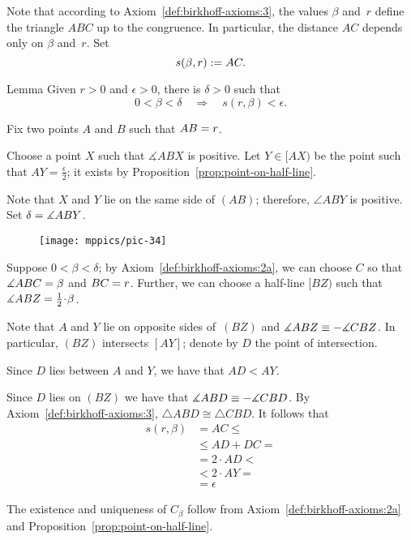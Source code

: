 Note that according to Axiom~\ref{def:birkhoff-axioms:3}, 
the values
$\beta$ and~$r$ define the triangle $ABC$ up to the congruence.
In particular, the distance $AC$ depends only on $\beta$ and~$r$.
Set 
$$s(\beta,r):= AC.$$

\begin{thm}[\abs]{Lemma}\label{lem:f(r,a)}
Given $r>0$ and $\epsilon>0$, there is $\delta>0$ such that
\[0<\beta<\delta\quad\Longrightarrow\quad s(r,\beta)<\epsilon.\]

\end{thm}

Fix two points $A$ and $B$ such that $AB\z=r$.

Choose a point $X$ such that $\measuredangle ABX$ is positive.
Let $Y\in [AX)$ be the point such that $AY=\tfrac\epsilon2$;
it exists by Proposition~\ref{prop:point-on-half-line}.

Note that $X$ and $Y$ lie on the same side of $(AB)$;
therefore, $\angle ABY$ is positive. 
Set $\delta\z=\measuredangle ABY$.

{

\begin{wrapfigure}{o}{36mm}
\centering
\texttt{[image: mppics/pic-34]}
\end{wrapfigure}

Suppose $0<\beta<\delta$;
by Axiom~\ref{def:birkhoff-axioms:2a}, we can choose $C$ so that $\measuredangle ABC\z=\beta$ and $BC\z=r$.
Further, we can choose a half-line $[BZ)$ such that $\measuredangle ABZ\z=\tfrac12\cdot \beta$.

Note that $A$ and $Y$ lie on opposite sides of~$(BZ)$ and  $\measuredangle ABZ\z\equiv -\measuredangle CBZ$.
In particular, $(BZ)$ intersects $[AY]$;
denote by $D$ the point of intersection.

Since $D$ lies between $A$ and $Y$, we have that $AD<AY$.

Since $D$ lies on $(BZ)$ we have that $\measuredangle ABD\z\equiv -\measuredangle CBD$.
By Axiom~\ref{def:birkhoff-axioms:3},
$\triangle ABD\cong \triangle CBD$.
It follows that
\begin{align*}
s(r,\beta)&=AC\le
\\
&\le AD+DC=
\\
&=2\cdot AD< 
\\
&< 2\cdot AY=
\\
&=\epsilon
\end{align*}
\qedsf

}

The existence and uniqueness of $C_\beta$ follow from Axiom~\ref{def:birkhoff-axioms:2a} and Proposition~\ref{prop:point-on-half-line}.

